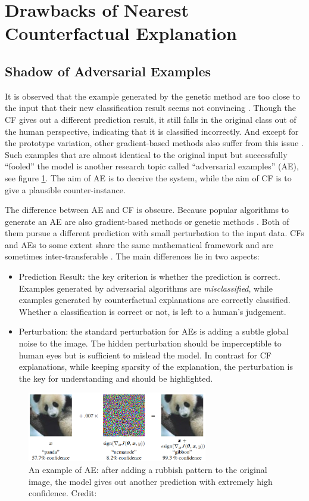 \section{Drawbacks of Nearest Counterfactual Explanation}\label{sec:adversarial}

\subsection{Shadow of Adversarial Examples}
It is observed that the example generated by the genetic method are too close to the input that their new classification result seems not convincing \cite{onePixel,certifai}. Though the CF gives out a different prediction result, it still falls in the original class out of the human perspective, indicating that it is classified incorrectly. And except for the prototype variation, other gradient-based methods also suffer from this issue \cite{prototype}. Such examples that are almost identical to the original input but successfully ``fooled'' the model is another research topic called ``adversarial examples'' (AE), see figure \ref{fig:AE}. The aim of AE is to deceive the system, while the aim of CF is to give a plausible counter-instance.

The difference between AE and CF is obscure. Because popular algorithms to generate an AE are also gradient-based methods or genetic methods \cite{AEoverview}. Both of them pursue a different prediction with small perturbation to the input data. CFs and AEs to some extent share the same mathematical framework and are sometimes inter-transferable \cite{CFandAE}. The main differences lie in two aspects:
\begin{itemize}
  \item Prediction Result: the key criterion is whether the prediction is correct. Examples generated by adversarial algorithms are \emph{misclassified}, while examples generated by counterfactual explanations are correctly classified. Whether a classification is correct or not, is left to a human's judgement.
  \item Perturbation: the standard perturbation for AEs is adding a subtle global noise to the image. The hidden perturbation should be imperceptible to human eyes but is sufficient to mislead the model. In contrast for CF explanations, while keeping sparsity of the explanation, the perturbation is the key for understanding and should be highlighted.  %
\end{itemize}
\begin{figure}
  \centering
  \includegraphics[width=0.7\textwidth]{adversarial.PNG}
  \caption{An example of AE: after adding a rubbish pattern to the original image, the model gives out another prediction with extremely high confidence. Credit: \cite{goodfellow2014explaining}}
  \label{fig:AE}
\end{figure}

